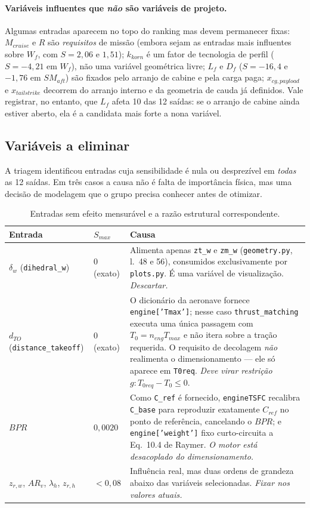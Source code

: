 \documentclass[11pt,a4paper]{article}
\newcommand{\code}[1]{\texttt{\small #1}}
\begin{document}
\paragraph{Vari\'aveis influentes que \emph{n\~ao} s\~ao vari\'aveis de projeto.}
Algumas entradas aparecem no topo do ranking mas devem permanecer fixas:
$M_{cruise}$ e $R$ s\~ao \emph{requisitos} de miss\~ao (embora sejam as
entradas mais influentes sobre $W_f$, com $S = 2{,}06$ e $1{,}51$);
$k_{korn}$ \'e um fator de tecnologia de perfil ($S = -4{,}21$ em $W_f$),
n\~ao uma vari\'avel geom\'etrica livre; $L_f$ e $D_f$ ($S = -16{,}4$ e
$-1{,}76$ em $SM_{aft}$) s\~ao fixados pelo arranjo de cabine e pela carga
paga; $x_{cg,payload}$ e $x_{tailstrike}$ decorrem do arranjo interno e da
geometria de cauda j\'a definidos. Vale registrar, no entanto, que $L_f$ afeta
10 das 12 sa\'idas: se o arranjo de cabine ainda estiver aberto, ela \'e a
candidata mais forte a nona vari\'avel.

\subsection{Vari\'aveis a eliminar}

A triagem identificou entradas cuja sensibilidade \'e nula ou desprez\'ivel em
\emph{todas} as 12 sa\'idas. Em tr\^es casos a causa n\~ao \'e falta de
import\^ancia f\'isica, mas uma decis\~ao de modelagem que o grupo precisa
conhecer antes de otimizar.

\begin{table}[H]
\centering
\caption{Entradas sem efeito mensur\'avel e a raz\~ao estrutural
correspondente.}
\label{tab:elim}
\small
\begin{tabular}{llp{8.6cm}}
\toprule
Entrada & $S_{max}$ & Causa \\
\midrule
$\delta_w$ (\code{dihedral\_w}) & $0$ (exato) &
  Alimenta apenas \code{zt\_w} e \code{zm\_w} (\code{geometry.py}, l.~48 e 56),
  consumidos exclusivamente por \code{plots.py}. \'E uma vari\'avel de
  visualiza\c{c}\~ao. \emph{Descartar.} \\[3pt]
$d_{TO}$ (\code{distance\_takeoff}) & $0$ (exato) &
  O dicion\'ario da aeronave fornece \code{engine['Tmax']}; nesse caso
  \code{thrust\_matching} executa uma \'unica passagem com
  $T_0 = n_{eng}T_{max}$ e n\~ao itera sobre a tra\c{c}\~ao requerida. O
  requisito de decolagem \emph{n\~ao} realimenta o dimensionamento --- ele s\'o
  aparece em \code{T0req}. \emph{Deve virar restri\c{c}\~ao}
  $g: T_{0req} - T_0 \le 0$. \\[3pt]
$BPR$ & $0{,}0020$ &
  Como \code{C\_ref} \'e fornecido, \code{engineTSFC} recalibra \code{C\_base}
  para reproduzir exatamente $C_{ref}$ no ponto de refer\^encia, cancelando o
  $BPR$; e \code{engine['weight']} fixo curto-circuita a Eq.~10.4 de Raymer.
  \emph{O motor est\'a desacoplado do dimensionamento.} \\[3pt]
$z_{r,w}$, $AR_v$, $\lambda_h$, $z_{r,h}$ & $< 0{,}08$ &
  Influ\^encia real, mas duas ordens de grandeza abaixo das vari\'aveis
  selecionadas. \emph{Fixar nos valores atuais.} \\
\bottomrule
\end{tabular}
\end{table}
\end{document}
